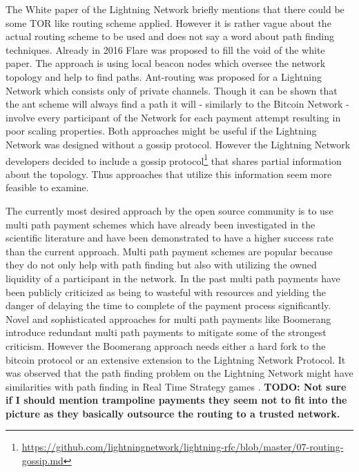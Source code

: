 \documentclass[a4paper]{paper}
\begin{document}
The White paper of the Lightning Network \cite{poon2016bitcoin} briefly mentions that there could be some TOR like routing scheme applied.
However it is rather vague about the actual routing scheme to be used and does not say a word about path finding techniques.
Already in 2016 Flare \cite{prihodko2016flare} was proposed to fill the void of the white paper.
The approach is using local beacon nodes which oversee the network topology and help to find paths.
Ant-routing \cite{grunspan2018ant} was proposed for a Lightning Network which consists only of private channels.
Though it can be shown that the ant scheme will always find a path it will - similarly to the Bitcoin Network - involve every participant of the Network for each payment attempt resulting in poor scaling properties.
Both approaches might be useful if the Lightning Network was designed without a gossip protocol.
However the Lightning Network developers decided to include a gossip protocol\footnote{\url{https://github.com/lightningnetwork/lightning-rfc/blob/master/07-routing-gossip.md}} that shares partial information about the topology.
Thus approaches that utilize this information seem more feasible to examine.

The currently most desired approach by the open source community is to use multi path payment schemes \cite{osuntokun2018AMP} which have already been investigated \cite{piatkivskyi2018split} in the scientific literature and have been demonstrated to have a higher success rate than the current approach.
Multi path payment schemes are popular because they do not only help with path finding but also with utilizing the owned liquidity of a participant in the network.
In the past multi path payments have been publicly criticized \cite{pickhardt2019pathfinding} as being to wasteful with resources and yielding the danger of delaying the time to complete of the payment process significantly.
Novel and sophisticated approaches for multi path payments like Boomerang \cite{bagaria2019boomerang} introduce redundant multi path payments to mitigate some of the strongest criticism.
However the Boomerang approach needs either a hard fork to the bitcoin protocol or an extensive extension to the Lightning Network Protocol. 
It was observed that the path finding problem on the Lightning Network might have similarities with path finding in Real Time Strategy games \cite{zmnscpxj2019rts}.
\textbf{TODO: Not sure if I should mention trampoline payments they seem not to fit into the picture as they basically outsource the routing to a trusted network.}
\end{document}
